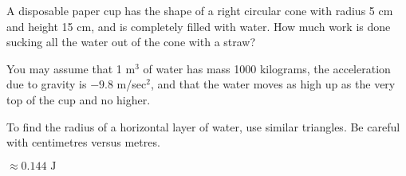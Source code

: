 \begin{question}\label{prob_s2.1:tank2}
A disposable paper cup has the shape of a right circular cone with radius 5 cm and height 15 cm, and is completely filled with water. How much work is done sucking all the water out of the cone with a straw?
\begin{center}
\end{center}
You may assume that 1 m$^3$ of water has mass 1000 kilograms, the acceleration due to gravity is $-9.8$ m/sec$^2$, and that the water moves as high up as the very top of the cup and no higher.
\end{question}
\begin{hint}
To find the radius of a horizontal layer of water, use similar triangles. Be careful with centimetres versus metres.
\end{hint}
\begin{answer}
$\approx 0.144\text{ J}$
\end{answer}
